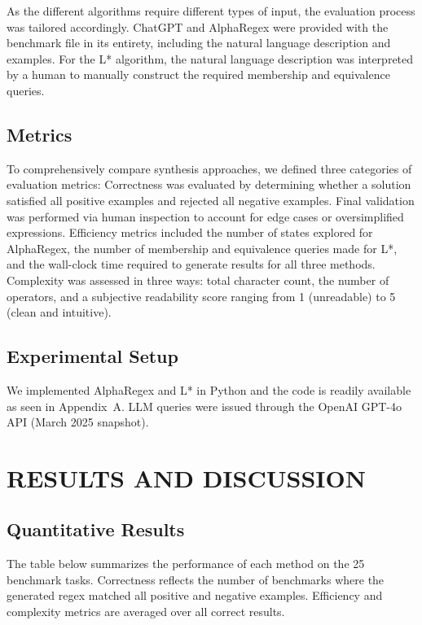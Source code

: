 \indent\indent As the different algorithms require different types of input, the evaluation process was tailored accordingly. ChatGPT and AlphaRegex were provided with the benchmark file in its entirety, including the natural language description and examples. For the L* algorithm, the natural language description was interpreted by a human to manually construct the required membership and equivalence queries.

\section{Metrics}

\indent\indent To comprehensively compare synthesis approaches, we defined three categories of evaluation metrics:
Correctness was evaluated by determining whether a solution satisfied all positive examples and rejected all negative examples. Final validation was performed via human inspection to account for edge cases or oversimplified expressions. Efficiency metrics included the number of states explored for AlphaRegex, the number of membership and equivalence queries made for L*, and the wall-clock time required to generate results for all three methods. Complexity was assessed in three ways: total character count, the number of operators, and a subjective readability score ranging from 1 (unreadable) to 5 (clean and intuitive).

\section{Experimental Setup}

\indent\indent We implemented AlphaRegex and L* in Python and the code is readily available as seen in Appendix~A. LLM queries were issued through the OpenAI GPT-4o API (March 2025 snapshot).

\chapter{RESULTS AND DISCUSSION}

\section{Quantitative Results}

\indent\indent The table below summarizes the performance of each method on the 25 benchmark tasks. Correctness reflects the number of benchmarks where the generated regex matched all positive and negative examples. Efficiency and complexity metrics are averaged over all correct results.

